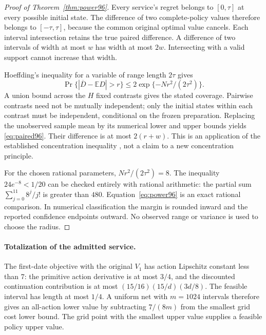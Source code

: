 \begin{proof}[Proof of Theorem~\ref{thm:power96}]
Every service's regret belongs to $[0,\tau]$ at every possible initial state. The difference of two complete-policy values therefore belongs to $[-\tau,\tau]$, because the common original optimal value cancels. Each interval intersection retains the true paired difference. A difference of two intervals of width at most $w$ has width at most $2w$. Intersecting with a valid support cannot increase that width.

Hoeffding's inequality for a variable of range length $2\tau$ gives
\[
 \Pr\{|\overline D-\mathbb ED|>r\}
       \leq2\exp\{-Nr^2/(2\tau^2)\}.
\]
A union bound across the $H$ fixed contrasts gives the stated coverage. Pairwise contrasts need not be mutually independent; only the initial states within each contrast must be independent, conditional on the frozen preparation. Replacing the unobserved sample mean by its numerical lower and upper bounds yields \eqref{eq:paired96}. Their difference is at most $2(r+w)$. This is an application of the established concentration inequality \citep{hoeffding1963}, not a claim to a new concentration principle.

For the chosen rational parameters, $Nr^2/(2\tau^2)=8$. The inequality $24e^{-8}<1/20$ can be checked entirely with rational arithmetic: the partial sum $\sum_{j=0}^{11}8^j/j!$ is greater than $480$. Equation~\eqref{eq:power96} is an exact rational comparison. In numerical classification the margin is rounded inward and the reported confidence endpoints outward. No observed range or variance is used to choose the radius.
\end{proof}

\paragraph{Totalization of the admitted service.}
The first-date objective with the original $V_1$ has action Lipschitz constant less than $7$: the primitive action derivative is at most $3/4$, and the discounted continuation contribution is at most $(15/16)(15/d)(3d/8)$. The feasible interval has length at most $1/4$. A uniform net with $m=1024$ intervals therefore gives an all-action lower value by subtracting $7/(8m)$ from the smallest grid cost lower bound. The grid point with the smallest upper value supplies a feasible policy upper value.

